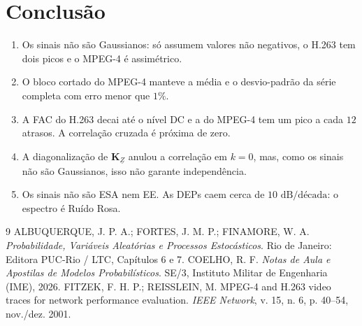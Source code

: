 \documentclass[11pt,a4paper]{article}
\begin{document}
\section*{Conclusão}

\begin{enumerate}[leftmargin=*, nosep]
    \item Os sinais não são Gaussianos: só assumem valores não negativos, o H.263 tem dois picos e o MPEG-4 é assimétrico.
    \item O bloco cortado do MPEG-4 manteve a média e o desvio-padrão da série completa com erro menor que $1\%$.
    \item A FAC do H.263 decai até o nível DC e a do MPEG-4 tem um pico a cada $12$ atrasos. A correlação cruzada é próxima de zero.
    \item A diagonalização de $\mathbf{K}_{\underline{Z}}$ anulou a correlação em $k=0$, mas, como os sinais não são Gaussianos, isso não garante independência.
    \item Os sinais não são ESA nem EE. As DEPs caem cerca de $10\text{ dB/década}$: o espectro é Ruído Rosa.
\end{enumerate}

\begin{thebibliography}{9}
 ALBUQUERQUE, J. P. A.; FORTES, J. M. P.; FINAMORE, W. A. \textit{Probabilidade, Variáveis Aleatórias e Processos Estocásticos}. Rio de Janeiro: Editora PUC-Rio / LTC, Capítulos 6 e 7.
 COELHO, R. F. \textit{Notas de Aula e Apostilas de Modelos Probabilísticos}. SE/3, Instituto Militar de Engenharia (IME), 2026.
 FITZEK, F. H. P.; REISSLEIN, M. MPEG-4 and H.263 video traces for network performance evaluation. \textit{IEEE Network}, v. 15, n. 6, p. 40--54, nov./dez. 2001.
\end{thebibliography}
\end{document}
